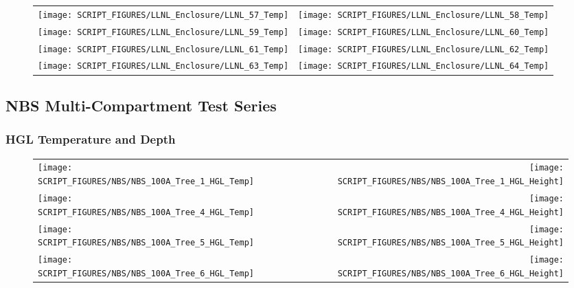 \begin{figure}[!ht]
\begin{tabular*}{\textwidth}{l@{\extracolsep{\fill}}r}
\texttt{[image: SCRIPT\_FIGURES/LLNL\_Enclosure/LLNL\_57\_Temp]} &
\texttt{[image: SCRIPT\_FIGURES/LLNL\_Enclosure/LLNL\_58\_Temp]} \\
\texttt{[image: SCRIPT\_FIGURES/LLNL\_Enclosure/LLNL\_59\_Temp]} &
\texttt{[image: SCRIPT\_FIGURES/LLNL\_Enclosure/LLNL\_60\_Temp]} \\
\texttt{[image: SCRIPT\_FIGURES/LLNL\_Enclosure/LLNL\_61\_Temp]} &
\texttt{[image: SCRIPT\_FIGURES/LLNL\_Enclosure/LLNL\_62\_Temp]} \\
\texttt{[image: SCRIPT\_FIGURES/LLNL\_Enclosure/LLNL\_63\_Temp]} &
\texttt{[image: SCRIPT\_FIGURES/LLNL\_Enclosure/LLNL\_64\_Temp]}
\end{tabular*}
\label{LLNL_Enclosure_Temp_8}
\end{figure}

\clearpage

\subsection{NBS Multi-Compartment Test Series}

\subsubsection{HGL Temperature and Depth}

\begin{figure}[!ht]
\begin{tabular*}{\textwidth}{l@{\extracolsep{\fill}}r}
\texttt{[image: SCRIPT\_FIGURES/NBS/NBS\_100A\_Tree\_1\_HGL\_Temp]} &
\texttt{[image: SCRIPT\_FIGURES/NBS/NBS\_100A\_Tree\_1\_HGL\_Height]} \\
\texttt{[image: SCRIPT\_FIGURES/NBS/NBS\_100A\_Tree\_4\_HGL\_Temp]} &
\texttt{[image: SCRIPT\_FIGURES/NBS/NBS\_100A\_Tree\_4\_HGL\_Height]} \\
\texttt{[image: SCRIPT\_FIGURES/NBS/NBS\_100A\_Tree\_5\_HGL\_Temp]} &
\texttt{[image: SCRIPT\_FIGURES/NBS/NBS\_100A\_Tree\_5\_HGL\_Height]}\\
\texttt{[image: SCRIPT\_FIGURES/NBS/NBS\_100A\_Tree\_6\_HGL\_Temp]} &
\texttt{[image: SCRIPT\_FIGURES/NBS/NBS\_100A\_Tree\_6\_HGL\_Height]}
\end{tabular*}
\end{figure}

